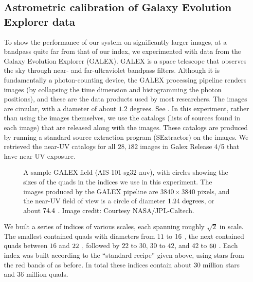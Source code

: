 

\subsection{Astrometric calibration of Galaxy Evolution Explorer data}


To show the performance of our system on significantly larger images,
at a bandpass quite far from that of our index, we experimented with
data from the Galaxy Evolution Explorer (GALEX).  GALEX is a space
telescope that observes the sky through near- and far-ultraviolet
bandpass filters.  Although it is fundamentally a photon-counting
device, the GALEX processing pipeline renders images (by collapsing
the time dimension and histogramming the photon positions), and these
are the data products used by most researchers.  The images are
circular, with a diameter of about $1.2$ degrees.  See
.  In this experiment, rather than using the
images themselves, we use the catalogs (lists of sources found in each
image) that are released along with the images.  These catalogs are
produced by running a standard source extraction program (SExtractor)
on the images.  We retrieved the near-UV catalogs for all $28,182$
images in Galex Release 4/5 that have near-UV exposure.


\begin{figure}[htp]
\begin{center}
\galexquadfig
\end{center}
\caption{A sample GALEX field (AIS-101-sg32-nuv),
with circles showing the sizes of the quads in the indices we use in
this experiment.  The images produced by the GALEX pipeline are
$3840\times3840$ pixels, and the near-UV field of view is a circle of
diameter $1.24~\mathrm{degrees}$, or about $74.4~$.  Image credit:
Courtesy NASA/JPL-Caltech.
\label{fig:galexquad}}

\end{figure}



We built a series of indices of various scales, each spanning roughly
$\sqrt{2}$ in scale.  The smallest contained quads with diameters from
$11$ to $16~$, the next contained quads between $16$ and
$22~$, followed by $22$ to $30$, $30$ to $42$, and $42$ to
$60~$.  Each index was built according to the ``standard
recipe'' given above, using stars from the red bands of \usnob as
before.  In total these indices contain about $30$ million stars and
$36$ million quads.


